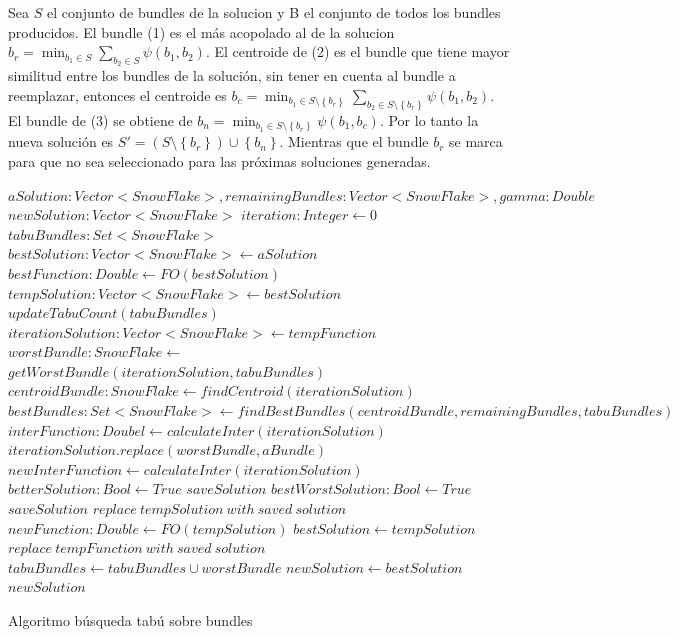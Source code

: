 Sea $S$ el conjunto de bundles de la solucion y B el conjunto de todos los bundles producidos. El bundle (1) es el más acopolado al de la solucion $b_r = \min_{b_1 \in S}{\sum_{b_2 \in S}{\psi(b_1,b_2)}}$. El centroide de (2) es el bundle que tiene mayor similitud entre los bundles de la solución, sin tener en cuenta al bundle a reemplazar, entonces el centroide es $b_c = \min_{b_1 \in S \setminus \left\{b_r\right\}}{\sum_{b_2 \in S \setminus \left\{b_r\right\}}{\psi(b_1,b_2)}}$. El bundle de (3) se obtiene de $b_n = \min_{b_1 \in S \setminus \left\{b_r\right\}}{\psi(b_1,b_c)}$. Por lo tanto la nueva solución es $S' = (S \setminus \left\{b_r\right\}) \cup \left\{b_n\right\}$. Mientras que el bundle $b_r$ se marca para que no sea seleccionado para las próximas soluciones generadas.
\begin{algorithm}[H]
\begin{algorithmic}[1]
\REQUIRE $aSolution: Vector<SnowFlake>, remainingBundles: Vector<SnowFlake>, gamma: Double$
\ENSURE $newSolution:Vector<SnowFlake>$
\STATE $iteration:Integer \leftarrow 0$
\STATE $tabuBundles: Set<SnowFlake>$
\STATE $bestSolution: Vector<SnowFlake> \leftarrow aSolution$
\STATE $bestFunction:Double \leftarrow FO(bestSolution)$
\STATE $tempSolution: Vector<SnowFlake> \leftarrow bestSolution$
  \STATE $updateTabuCount(tabuBundles)$
  \STATE $iterationSolution: Vector<SnowFlake> \leftarrow tempFunction$
  \STATE $worstBundle: SnowFlake \leftarrow$\\
  $getWorstBundle(iterationSolution, tabuBundles)$
  \STATE $centroidBundle: SnowFlake \leftarrow findCentroid(iterationSolution)$
  \STATE $bestBundles: Set<SnowFlake> \leftarrow findBestBundles(centroidBundle, remainingBundles, tabuBundles)$
  \STATE $interFunction: Doubel \leftarrow calculateInter(iterationSolution)$
    \STATE $iterationSolution.replace(worstBundle, aBundle)$
    \STATE $newInterFunction \leftarrow calculateInter(iterationSolution)$
      \STATE $betterSolution: Bool \leftarrow True$
      \STATE $saveSolution$
    \ELSE
        \STATE $bestWorstSolution: Bool \leftarrow True$
        \STATE $saveSolution$
      \ENDIF
    \ENDIF
  \ENDFOR
    \STATE $replace\ tempSolution\ with\ saved\ solution$
    \STATE $newFunction: Double \leftarrow FO(tempSolution)$
      \STATE $bestSolution \leftarrow tempSolution$
    \ENDIF
  \ELSE
      \STATE $replace\ tempFunction\ with\ saved\ solution$
    \ENDIF
  \ENDIF
  \STATE $tabuBundles \leftarrow tabuBundles \cup {worstBundle}$
\ENDWHILE
\STATE $newSolution \leftarrow bestSolution$
\RETURN $newSolution$
\end{algorithmic}
\caption{Algoritmo búsqueda tabú sobre bundles}\label{alg:algBusTabuBundle}
\end{algorithm}

